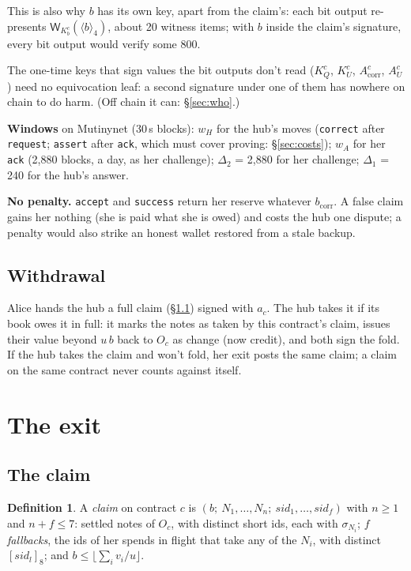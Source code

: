 \documentclass[11pt]{article}
\theoremstyle{plain}
\theoremstyle{definition}
\newtheorem{definition}{Definition}
\newcommand{\bcorr}{b_{\mathrm{corr}}}
\newcommand{\tx}[1]{\texttt{#1}}
\newcommand{\be}[2]{\langle #1\rangle_{#2}}
\newcommand{\pre}[2]{[#1]_{#2}}
\newcommand{\Wots}{\mathsf{W}}
\newcommand{\sid}{\mathit{sid}}
\newcommand{\Oc}{O_c}
\newcommand{\KQ}{K_{Q}^{c}}
\newcommand{\Kb}{K_{b}^{c}}
\newcommand{\KU}{K_{U}^{c}}
\newcommand{\Acorr}{A_{\mathrm{corr}}^{c}}
\newcommand{\AU}{A_{U}^{c}}
\begin{document}
This is also why $b$ has its own key, apart from the claim's: each bit
output re-presents $\Wots_{\Kb}(\be{b}{4})$, about 20 witness items; with
$b$ inside the claim's signature, every bit output would verify some
800.

The one-time keys that sign values the bit outputs don't read ($\KQ$,
$\KU$, $\Acorr$, $\AU$) need no equivocation leaf: a second signature
under one of them has nowhere on chain to do harm. (Off chain it can:
\S\ref{sec:who}.)

\textbf{Windows} on Mutinynet (30\,s blocks): $w_H$ for the hub's moves
(\tx{correct} after \tx{request}; \tx{assert} after \tx{ack}, which must
cover proving: \S\ref{sec:costs}); $w_A$ for her \tx{ack} (2,880 blocks,
a day, as her challenge); $\Delta_2$ = 2,880 for her challenge;
$\Delta_1$ = 240 for the hub's answer.

\textbf{No penalty.} \tx{accept} and \tx{success} return her reserve
whatever $\bcorr$. A false claim
gains her nothing (she is paid what she is owed) and costs the hub one
dispute; a penalty would also strike an honest wallet restored from a
stale backup.

\subsection{Withdrawal}\label{sec:withdrawal}

Alice hands the hub a full claim (\S\ref{sec:claim}) signed with $a_c$.
The hub takes it if its book owes it in full: it marks the notes as
taken by this contract's claim, issues their value beyond $u\,b$ back to
$\Oc$ as change (now credit), and both sign the fold. If the hub takes
the claim and won't fold, her exit posts the same claim; a claim on the
same contract never counts against itself.

\section{The exit}\label{sec:exit}

\subsection{The claim}\label{sec:claim}

\begin{definition}
A \emph{claim} on contract $c$ is $(b;\ N_1, \dots, N_n;\ \sid_1, \dots,
\sid_f)$ with $n \ge 1$ and $n + f \le 7$: settled notes of $\Oc$, with
distinct short ids, each with $\sigma_{N_i}$; $f$
\emph{fallbacks}, the ids of her spends in flight that take any of the
$N_i$, with distinct $\pre{\sid_l}{8}$; and $b \le \lfloor \sum_i v_i /
u\rfloor$.
\end{definition}
\end{document}
